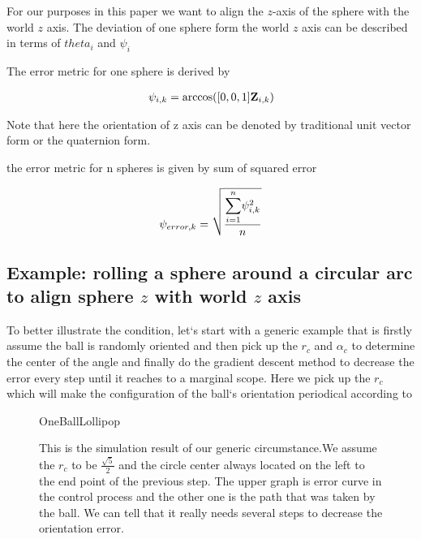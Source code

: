 \documentclass[letter paper, 10pt, conference]{ieeeconf}
\newcommand{\todo}[1]{\vspace{5 mm}\par \noindent \framebox{\begin{minipage}[c]{0.98 \columnwidth} \ttfamily\flushleft \textcolor{red}{#1}\end{minipage}}\vspace{5 mm}\par}
\begin{document}
For our purposes in this paper we want to align the $z$-axis of the sphere with the world $z$ axis.  The deviation of one sphere form the world  $z$ axis can be described in terms of $theta_i$ and $\psi_i$  


 The error metric for one sphere is derived by
 
\begin{align}
\psi_{i,k} = \arccos([0,0,1]{\bf Z}_{i,k}) \label{eq:errorForOneSphere}
\end{align}

Note that here the orientation of z axis can be denoted by traditional unit vector form or the quaternion form.

 the error metric for n spheres is given by sum of squared error
 
\begin{align}
\psi_{error,k} = \sqrt{\frac{\mathlarger{\sum}_{i=1}^{n}\psi_{i,k}^2}{n}} \label{eq:errorForManySpheres}
\end{align}



\subsection{Example: rolling a sphere around a circular arc to align sphere $z$ with world $z$ axis}

To better illustrate the condition, let`s start with a generic example that is firstly assume the ball is randomly oriented and then pick up the $r_c$ and $\alpha_c$ to determine the center of the angle and finally do the gradient descent method to decrease the error every step until it reaches to a marginal scope. Here we pick up the $r_c$ which will make the configuration of the ball`s orientation periodical according to \todo{ [[insert references:Ball Rolling and Cone]] }
    \begin{figure}%
	\begin{center}
	\begin{overpic}[width=.9\columnwidth]{OneBallLollipop}
	\end{overpic}
	\end{center}
	\vspace{-1em}
	\caption{ \label{fig:OneBallLollipop} This is the simulation result of our generic circumstance.We assume the $r_c$ to be $\frac{\sqrt{5}}{2}$ and the circle center always located on the left to the end point of the previous step. The upper graph is error curve in the control process and the other one is the path that was taken by the ball. We can tell that it really needs several steps to decrease the orientation error.
}\vspace{-1em}
\end{figure}
\end{document}
